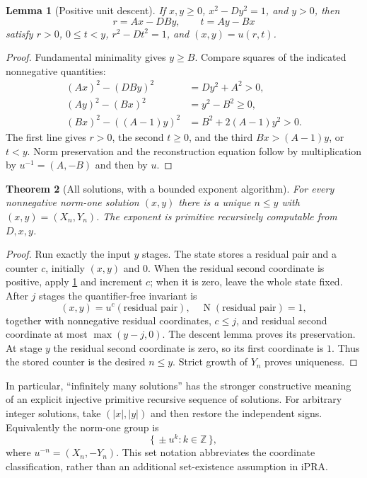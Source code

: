 \documentclass[11pt,letterpaper]{article}
\newtheorem{theorem}{Theorem}[section]
\newtheorem{lemma}[theorem]{Lemma}
\theoremstyle{definition}
\newcommand{\Z}{\mathbb Z}
\newcommand{\Nm}{\operatorname{N}}
\newcommand{\abs}[1]{\lvert#1\rvert}
\begin{document}
\begin{lemma}[Positive unit descent]\label{lem:unitdescent}
If $x,y\ge0$, $x^2-Dy^2=1$, and $y>0$, then
\[
 r=Ax-DBy,\qquad t=Ay-Bx
\]
satisfy $r>0$, $0\le t<y$, $r^2-Dt^2=1$, and
$(x,y)=u(r,t)$.
\end{lemma}
\begin{proof}
Fundamental minimality gives $y\ge B$. Compare squares of the indicated
nonnegative quantities:
\begin{align*}
 (Ax)^2-(DBy)^2&=Dy^2+A^2>0,\\
 (Ay)^2-(Bx)^2&=y^2-B^2\ge0,\\
 (Bx)^2-((A-1)y)^2&=B^2+2(A-1)y^2>0.
\end{align*}
The first line gives $r>0$, the second $t\ge0$, and the third
$Bx>(A-1)y$, or $t<y$. Norm preservation and the reconstruction equation
follow by multiplication by $u^{-1}=(A,-B)$ and then by $u$.
\end{proof}

\begin{theorem}[All solutions, with a bounded exponent algorithm]\label{thm:powers}
For every nonnegative norm-one solution $(x,y)$ there is a unique $n\le y$
with $(x,y)=(X_n,Y_n)$. The exponent is primitive recursively computable
from $D,x,y$.
\end{theorem}
\begin{proof}
Run exactly the input $y$ stages. The state stores a residual pair and a
counter $c$, initially $(x,y)$ and $0$. When the residual second
coordinate is positive, apply \cref{lem:unitdescent} and increment $c$;
when it is zero, leave the whole state fixed.
After $j$ stages the quantifier-free invariant is
\[
 (x,y)=u^c(\text{residual pair}),\quad
 \Nm(\text{residual pair})=1,
\]
together with nonnegative residual coordinates, $c\le j$, and residual
second coordinate at most $\max(y-j,0)$.
The descent lemma proves its preservation. At stage $y$ the residual second
coordinate is zero, so its first coordinate is $1$. Thus the stored counter
is the desired $n\le y$. Strict growth of $Y_n$ proves uniqueness.
\end{proof}

In particular, ``infinitely many solutions'' has the stronger constructive
meaning of an explicit injective primitive recursive sequence of solutions.
For arbitrary integer solutions, take $(\abs x,\abs y)$ and then restore
the independent signs. Equivalently the norm-one group is
\[
 \{\,\pm u^k:k\in\Z\,\},
\]
where $u^{-n}=(X_n,-Y_n)$. This set notation abbreviates the coordinate
classification, rather than an additional set-existence assumption in iPRA.
\end{document}
